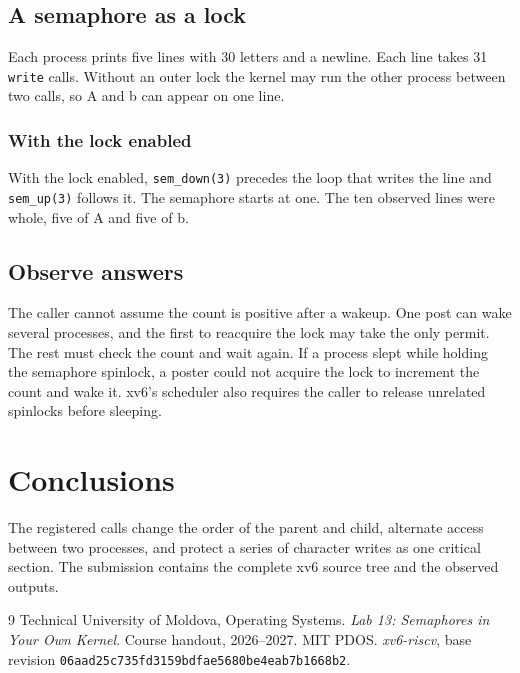 
\clearpage
\section{A semaphore as a lock}

Each process prints five lines with 30 letters and a newline. Each line takes 31 \texttt{write} calls. Without an outer lock the kernel may run the other process between two calls, so A and b can appear on one line.


\clearpage
\subsection{With the lock enabled}

With the lock enabled, \texttt{sem\_down(3)} precedes the loop that writes the line and \texttt{sem\_up(3)} follows it. The semaphore starts at one. The ten observed lines were whole, five of A and five of b.


\section{Observe answers}

The caller cannot assume the count is positive after a wakeup. One post can wake several processes, and the first to reacquire the lock may take the only permit. The rest must check the count and wait again. If a process slept while holding the semaphore spinlock, a poster could not acquire the lock to increment the count and wake it. xv6's scheduler also requires the caller to release unrelated spinlocks before sleeping.

\chapter{Conclusions}

The registered calls change the order of the parent and child, alternate access between two processes, and protect a series of character writes as one critical section. The submission contains the complete xv6 source tree and the observed outputs.

\begin{thebibliography}{9}
 Technical University of Moldova, Operating Systems. \emph{Lab 13: Semaphores in Your Own Kernel}. Course handout, 2026--2027.
 MIT PDOS. \emph{xv6-riscv}, base revision \texttt{06aad25c735fd3159bdfae5680be4eab7b1668b2}.
\end{thebibliography}
